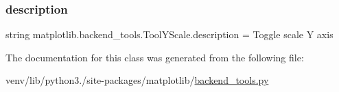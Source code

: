 \mbox{\label{classmatplotlib_1_1backend__tools_1_1ToolYScale_abcd30027d63fb58782283800246f2b67}} 
\subsubsection{\texorpdfstring{description}{description}}
{\footnotesize\ttfamily string matplotlib.\+backend\+\_\+tools.\+Tool\+Y\+Scale.\+description = \textquotesingle{}Toggle scale Y axis\textquotesingle{}\hspace{0.3cm}{\ttfamily [static]}}



The documentation for this class was generated from the following file\+:\begin{DoxyCompactItemize}
\item 
venv/lib/python3./site-\/packages/matplotlib/\hyperlink{backend__tools_8py}{backend\+\_\+tools.\+py}\end{DoxyCompactItemize}
